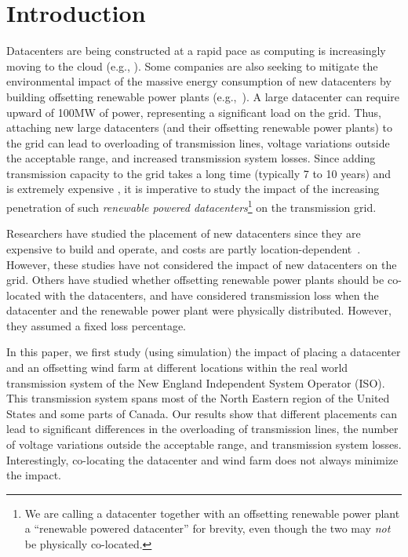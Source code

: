\section{Introduction}
\label{sec:intro}

Datacenters are being constructed at a rapid pace as computing is increasingly moving to the cloud (e.g., \cite{RM14DCGrowth}).  Some companies are also seeking to mitigate the environmental impact of the massive energy consumption of new datacenters by building offsetting renewable power plants (e.g.,~\cite{GoogleGreen,Apple13,McGrawHill11}).  A large datacenter can require upward of 100MW of power, representing a significant load on the grid.  Thus, attaching new large datacenters (and their offsetting renewable power plants) to the grid can lead to overloading of transmission lines, voltage variations outside the acceptable range, and increased transmission system losses.
Since adding transmission capacity to the grid takes a long time (typically 7 to 10 years) and is extremely expensive \cite{interconnection2010survey}, it is imperative to study the impact of
the increasing penetration of such 
{\em renewable powered datacenters}\footnote{We are calling a datacenter together with an offsetting renewable power plant a ``renewable powered datacenter'' for brevity, even though the two may {\em not} be physically co-located.}
on the transmission grid.

Researchers have studied the placement of new datacenters since they are expensive to build and operate, and costs are partly location-dependent~\cite{Goiri11place,Dalger05,Boley09,larumbe2012optimal,berral2014building}.  However, these studies have not considered the impact of new datacenters on the grid.  Others have studied whether offsetting renewable power plants should be co-located with the datacenters\cite{Ren12MASCOTS}, and have considered transmission loss when the datacenter and the renewable power plant were physically distributed.  However, they assumed a fixed loss percentage.

In this paper, we first study (using simulation) the impact of placing a datacenter and an offsetting wind farm at different locations within the real world transmission system of the New England Independent System Operator (ISO).  This transmission system spans most of the North Eastern region of the United States and some parts of Canada.  Our results show that different placements can lead to significant differences in the overloading of transmission lines, the number of voltage variations outside the acceptable range, and transmission system losses.  Interestingly, co-locating the datacenter and wind farm does not always minimize the impact.


